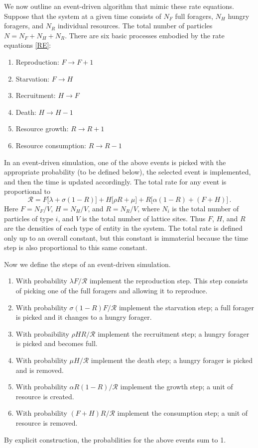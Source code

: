 \documentclass[11pt]{iopart}
\begin{document}
We now outline an event-driven algorithm that mimic these rate equations.
Suppose that the system at a given time consists of $N_F$ full foragers,
$N_H$ hungry foragers, and $N_R$ individual resources.  The total number of
particles $N=N_F+N_H+N_R$.  There are six basic processes embodied by the
rate equations \eqref{RE}:
\begin{enumerate}
\item Reproduction:  $F\to F+1$
\item Starvation:  $F\to H$
\item Recruitment: $H\to F$
\item Death: $H\to H-1$
\item Resource growth: $R\to R+1$
\item Resource consumption: $R\to R-1$
\end{enumerate}

In an event-driven simulation, one of the above events is picked with the
appropriate probability (to be defined below), the selected event is
implemented, and then the time is updated accordingly.  The total rate for
any event is proportional to
\begin{equation}
\mathcal{R}=F\big[\lambda +\sigma(1-R)\big]+ H\big[\rho R+\mu\big]+
R\big[\alpha(1-R)+(F+H)\big]\,.
\end{equation}
Here $F=N_F/V$, $H=N_H/V$, and $R=N_R/V$, where $N_i$ is the total number of
particles of type $i$, and $V$ is the total number of lattice sites.  Thus $F$,
$H$, and $R$ are the densities of each type of entity in the system.  The
total rate is defined only up to an overall constant, but this constant is
immaterial because the time step is also proportional to this same constant.

Now we define the steps of an event-driven simulation.  
\begin{enumerate}
\item With probability $\lambda F/\mathcal{R}$ implement the reproduction step.
  This step consists of picking one of the full foragers and allowing it to
  reproduce.
\item With probability $\sigma(1-R)F/\mathcal{R}$ implement the starvation
  step; a full forager is picked and it changes to a hungry forager.
\item With probaibility $\rho HR/\mathcal{R}$ implement the recruitment step;
  a hungry forager is picked and becomes full.
\item With probability $\mu H/\mathcal{R}$ implement the death step; a hungry
  forager is picked and is removed. 
\item With probability $\alpha R(1-R)/\mathcal{R}$ implement the growth step;
  a unit of resource is created.
\item With probability $(F+H)R/\mathcal{R}$ implement the consumption step; a
  unit of resource is removed.
\end{enumerate}
By explicit construction, the probabilities for the above events sum to 1.
\end{document}

